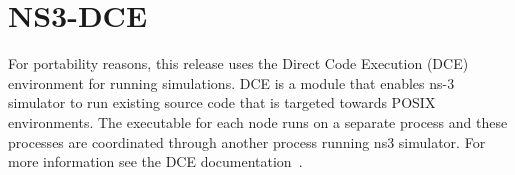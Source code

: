 % 
% 



\section{NS3-DCE}

For portability reasons, this release uses the Direct Code Execution (DCE)~\cite{dce} environment for running simulations. 
DCE is a module that enables ns-3 simulator to run existing source code that is targeted towards POSIX environments. 
The executable for each node runs on a separate process and these processes are coordinated through another process running ns3 simulator.  
For more information see the DCE documentation~\cite{dce}.


